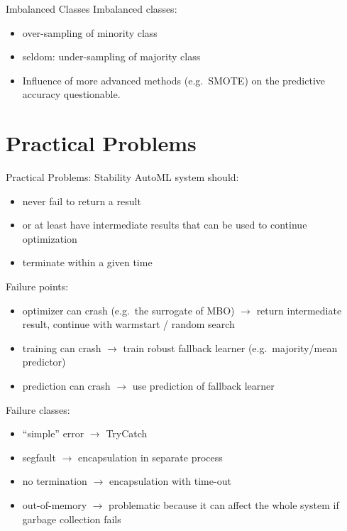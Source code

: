 \begin{frame}{Imbalanced Classes}
  Imbalanced classes:
  \begin{itemize}
    \item over-sampling of minority class
    \item seldom: under-sampling of majority class
    \item Influence of more advanced methods (e.g.\ SMOTE) on the predictive accuracy questionable.
  \end{itemize}
\end{frame}

\section{Practical Problems}

\begin{frame}{Practical Problems: Stability}
  AutoML system should: 
  \begin{itemize}
    \item never fail to return a result
    \item or at least have intermediate results that can be used to continue optimization
    \item terminate within a given time
  \end{itemize}

  Failure points:
  \begin{itemize}
    \item optimizer can crash (e.g.\ the surrogate of MBO) $\longrightarrow$ return intermediate result, continue with warmstart / random search
    \item training can crash $\longrightarrow$ train robust fallback learner (e.g.\ majority/mean predictor)
    \item prediction can crash $\longrightarrow$ use prediction of fallback learner
  \end{itemize}

  Failure classes:
  \begin{itemize}
    \item ``simple'' error $\longrightarrow$ TryCatch
    \item segfault $\longrightarrow$ encapsulation in separate process
    \item no termination $\longrightarrow$ encapsulation with time-out
    \item out-of-memory $\longrightarrow$ problematic because it can affect the whole system if garbage collection fails
  \end{itemize}

\end{frame}

